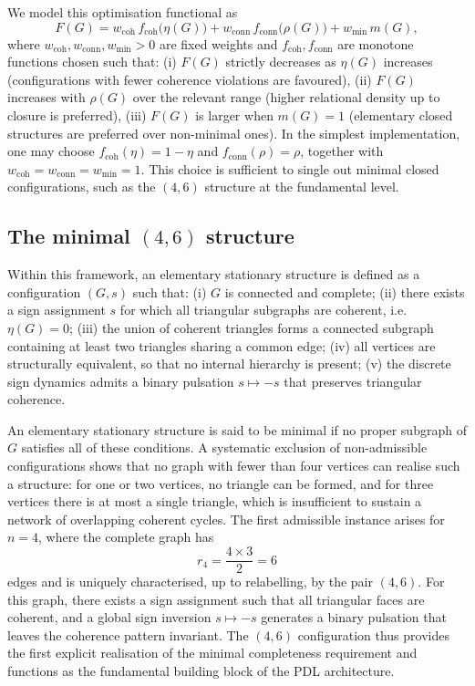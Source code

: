 \documentclass[12pt,a4paper]{article}
\begin{document}
We model this optimisation functional as
\[
  F(G)
  =
  w_{\text{coh}}\,f_{\text{coh}}\!\bigl(\eta(G)\bigr)
  +
  w_{\text{conn}}\,f_{\text{conn}}\!\bigl(\rho(G)\bigr)
  +
  w_{\min}\,m(G),
\]
where \(w_{\text{coh}},w_{\text{conn}},w_{\min}>0\) are fixed weights and \(f_{\text{coh}},f_{\text{conn}}\) are monotone functions chosen such that:
(i) \(F(G)\) strictly decreases as \(\eta(G)\) increases (configurations with fewer coherence violations are favoured),
(ii) \(F(G)\) increases with \(\rho(G)\) over the relevant range (higher relational density up to closure is preferred),
(iii) \(F(G)\) is larger when \(m(G)=1\) (elementary closed structures are preferred over non-minimal ones).
In the simplest implementation, one may choose \(f_{\text{coh}}(\eta)=1-\eta\) and \(f_{\text{conn}}(\rho)=\rho\), together with \(w_{\text{coh}}=w_{\text{conn}}=w_{\min}=1\). This choice is sufficient to single out minimal closed configurations, such as the \((4,6)\) structure at the fundamental level.\cite{Laubscher2026IntroPDL,Laubscher2026PDL_English}

\subsection{The minimal \texorpdfstring{\((4,6)\)}{(4,6)} structure}

Within this framework, an elementary stationary structure is defined as a configuration \((G,s)\) such that:
(i) \(G\) is connected and complete;
(ii) there exists a sign assignment \(s\) for which all triangular subgraphs are coherent, i.e. \(\eta(G)=0\);
(iii) the union of coherent triangles forms a connected subgraph containing at least two triangles sharing a common edge;
(iv) all vertices are structurally equivalent, so that no internal hierarchy is present;
(v) the discrete sign dynamics admits a binary pulsation \(s\mapsto -s\) that preserves triangular coherence.\cite{Laubscher2026IntroPDL,Laubscher2026PDL_English}

An elementary stationary structure is said to be minimal if no proper subgraph of \(G\) satisfies all of these conditions.
A systematic exclusion of non-admissible configurations shows that no graph with fewer than four vertices can realise such a structure: for one or two vertices, no triangle can be formed, and for three vertices there is at most a single triangle, which is insufficient to sustain a network of overlapping coherent cycles.
The first admissible instance arises for \(n=4\), where the complete graph has
\[
  r_4 = \frac{4\times 3}{2} = 6
\]
edges and is uniquely characterised, up to relabelling, by the pair \((4,6)\).\cite{Laubscher2026IntroPDL,Laubscher2026PDL_English}
For this graph, there exists a sign assignment such that all triangular faces are coherent, and a global sign inversion \(s\mapsto -s\) generates a binary pulsation that leaves the coherence pattern invariant.
The \((4,6)\) configuration thus provides the first explicit realisation of the minimal completeness requirement and functions as the fundamental building block of the PDL architecture.
\end{document}
